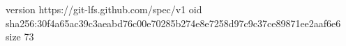 version https://git-lfs.github.com/spec/v1
oid sha256:30f4a65ac39c3aeabd76c00e70285b274e8e7258d97c9c37ce89871ee2aaf6e6
size 73
